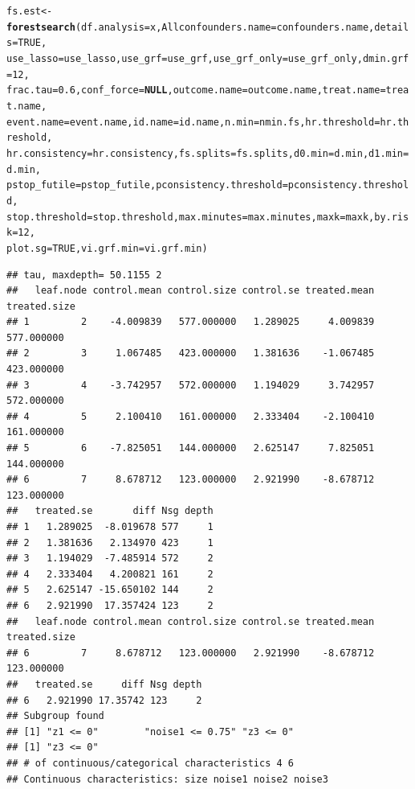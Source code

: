 \documentclass[smallextended]{svjour3}
\makeatletter
\newcommand{\hlnum}[1]{\textcolor[rgb]{0.686,0.059,0.569}{#1}}%
\newcommand{\hlstd}[1]{\textcolor[rgb]{0.345,0.345,0.345}{#1}}%
\newcommand{\hlkwa}[1]{\textcolor[rgb]{0.161,0.373,0.58}{\textbf{#1}}}%
\newcommand{\hlkwb}[1]{\textcolor[rgb]{0.69,0.353,0.396}{#1}}%
\newcommand{\hlkwc}[1]{\textcolor[rgb]{0.333,0.667,0.333}{#1}}%
\newcommand{\hlkwd}[1]{\textcolor[rgb]{0.737,0.353,0.396}{\textbf{#1}}}%
\newenvironment{kframe}{%
 \def\at@end@of@kframe{}%
 \ifinner\ifhmode%
  \def\at@end@of@kframe{\end{minipage}}%
  \begin{minipage}{\columnwidth}%
 \fi\fi%
 \def\FrameCommand##1{\hskip\@totalleftmargin \hskip-\fboxsep
 \colorbox{shadecolor}{##1}\hskip-\fboxsep
     \hskip-\linewidth \hskip-\@totalleftmargin \hskip\columnwidth}%
 \MakeFramed {\advance\hsize-\width
   \@totalleftmargin\z@ \linewidth\hsize
   \@setminipage}}%
 {\par\unskip\endMakeFramed%
 \at@end@of@kframe}
\newenvironment{knitrout}{}{} %
\makeatother
\begin{document}
\begin{knitrout}
\begin{kframe}
\begin{alltt}
\hlstd{fs.est} \hlkwb{<-} \hlkwd{forestsearch}\hlstd{(}\hlkwc{df.analysis} \hlstd{= x,} \hlkwc{Allconfounders.name} \hlstd{= confounders.name,} \hlkwc{details} \hlstd{=} \hlnum{TRUE}\hlstd{,}
    \hlkwc{use_lasso} \hlstd{= use_lasso,} \hlkwc{use_grf} \hlstd{= use_grf,} \hlkwc{use_grf_only} \hlstd{= use_grf_only,} \hlkwc{dmin.grf} \hlstd{=} \hlnum{12}\hlstd{,}
    \hlkwc{frac.tau} \hlstd{=} \hlnum{0.6}\hlstd{,} \hlkwc{conf_force} \hlstd{=} \hlkwa{NULL}\hlstd{,} \hlkwc{outcome.name} \hlstd{= outcome.name,} \hlkwc{treat.name} \hlstd{= treat.name,}
    \hlkwc{event.name} \hlstd{= event.name,} \hlkwc{id.name} \hlstd{= id.name,} \hlkwc{n.min} \hlstd{= nmin.fs,} \hlkwc{hr.threshold} \hlstd{= hr.threshold,}
    \hlkwc{hr.consistency} \hlstd{= hr.consistency,} \hlkwc{fs.splits} \hlstd{= fs.splits,} \hlkwc{d0.min} \hlstd{= d.min,} \hlkwc{d1.min} \hlstd{= d.min,}
    \hlkwc{pstop_futile} \hlstd{= pstop_futile,} \hlkwc{pconsistency.threshold} \hlstd{= pconsistency.threshold,}
    \hlkwc{stop.threshold} \hlstd{= stop.threshold,} \hlkwc{max.minutes} \hlstd{= max.minutes,} \hlkwc{maxk} \hlstd{= maxk,} \hlkwc{by.risk} \hlstd{=} \hlnum{12}\hlstd{,}
    \hlkwc{plot.sg} \hlstd{=} \hlnum{TRUE}\hlstd{,} \hlkwc{vi.grf.min} \hlstd{= vi.grf.min)}
\end{alltt}
\begin{verbatim}
## tau, maxdepth= 50.1155 2 
##   leaf.node control.mean control.size control.se treated.mean treated.size
## 1         2    -4.009839   577.000000   1.289025     4.009839   577.000000
## 2         3     1.067485   423.000000   1.381636    -1.067485   423.000000
## 3         4    -3.742957   572.000000   1.194029     3.742957   572.000000
## 4         5     2.100410   161.000000   2.333404    -2.100410   161.000000
## 5         6    -7.825051   144.000000   2.625147     7.825051   144.000000
## 6         7     8.678712   123.000000   2.921990    -8.678712   123.000000
##   treated.se       diff Nsg depth
## 1   1.289025  -8.019678 577     1
## 2   1.381636   2.134970 423     1
## 3   1.194029  -7.485914 572     2
## 4   2.333404   4.200821 161     2
## 5   2.625147 -15.650102 144     2
## 6   2.921990  17.357424 123     2
##   leaf.node control.mean control.size control.se treated.mean treated.size
## 6         7     8.678712   123.000000   2.921990    -8.678712   123.000000
##   treated.se     diff Nsg depth
## 6   2.921990 17.35742 123     2
## Subgroup found 
## [1] "z1 <= 0"        "noise1 <= 0.75" "z3 <= 0"       
## [1] "z3 <= 0"
## # of continuous/categorical characteristics 4 6 
## Continuous characteristics: size noise1 noise2 noise3 

\end{verbatim}
\end{kframe}
\end{knitrout}
\end{document}
